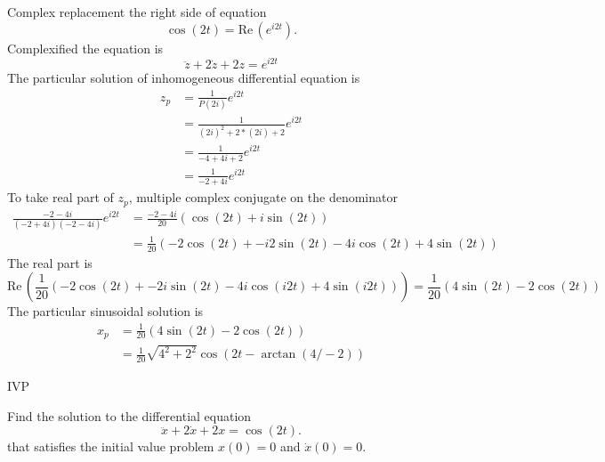 Complex replacement the right side of equation
\begin{equation*}
  \cos (2t) = \mathrm{Re\, }(e^{i2t}). 
\end{equation*}
Complexified the equation is
\begin{equation*}
  \ddot z+2\dot z+2z=e^{i2t}
\end{equation*}
The particular solution of inhomogeneous differential equation is
\begin{align*}
  z_ p &= \frac{1}{P(2i)} e^{i2t} \\
       &= \frac{1}{(2i)^2 + 2*(2i) + 2} e^{i2t}\\
       &= \frac{1}{-4 + 4i + 2} e^{i2t} \\
       &= \frac{1}{-2 + 4i} e^{i2t}
\end{align*}
To take real part of $z_ p$, multiple complex conjugate on the denominator
\begin{align*}
  \frac{-2 -4i}{(-2 + 4i)(-2 -4i)} e^{i2t}
  &= \frac{-2 -4i}{20} \left( \cos(2t) + i \sin(2t) \right) \\
  &= \frac{1}{20} \left(-2 \cos(2t) + -i2 \sin(2t)
    -4i \cos(2t) + 4 \sin(2t) \right)
\end{align*}
The real part is
\begin{equation*}
  \mathrm{Re\, } \left( \frac{1}{20} \left(-2 \cos(2t) + -2i \sin(2t)
      -4i \cos(i2t) + 4 \sin(i2t) \right) \right)
  = \frac{1}{20} \left(4 \sin(2t) - 2 \cos(2t) \right)
\end{equation*}
The particular sinusoidal solution is
\begin{align*}
  x_ p &= \frac{1}{20} \left(4 \sin(2t) - 2 \cos(2t) \right) \\
       &=  \frac{1}{20}  \sqrt{4^2 + 2^2} \cos (2t - \arctan (4 / -2)) 
\end{align*}


\begin{problem}
  IVP
\end{problem}
Find the solution to the differential equation
\begin{equation*}
  \ddot x+2\dot x+2x=\cos (2t).
\end{equation*}
that satisfies the initial value problem $x(0) = 0$ and $\dot{x} (0) = 0$.\\

